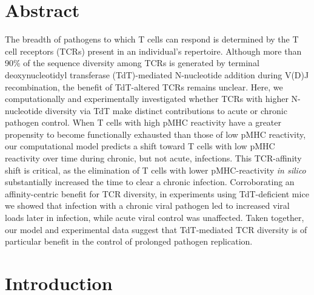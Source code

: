 \newpage
\section{Abstract}

The breadth of pathogens to which T cells can respond is determined by the T cell receptors (TCRs) present in an individual’s repertoire. Although more than 90\% of the sequence diversity among TCRs is generated by terminal deoxynucleotidyl transferase (TdT)-mediated N-nucleotide addition during V(D)J recombination, the benefit of TdT-altered TCRs remains unclear. Here, we computationally and experimentally investigated whether TCRs with higher N-nucleotide diversity via TdT make distinct contributions to acute or chronic pathogen control. When T cells with high pMHC reactivity have a greater propensity to become functionally exhausted than those of low pMHC reactivity, our computational model predicts a shift toward T cells with low pMHC reactivity over time during chronic, but not acute, infections. This TCR-affinity shift is critical, as the elimination of T cells with lower pMHC-reactivity \textit{in silico} substantially increased the time to clear a chronic infection. Corroborating an affinity-centric benefit for TCR diversity, in experiments using TdT-deficient mice we showed that infection with a chronic viral pathogen led to increased viral loads later in infection, while acute viral control was unaffected. Taken together, our model and experimental data suggest that TdT-mediated TCR diversity is of particular benefit in the control of prolonged pathogen replication.


\section{Introduction}

